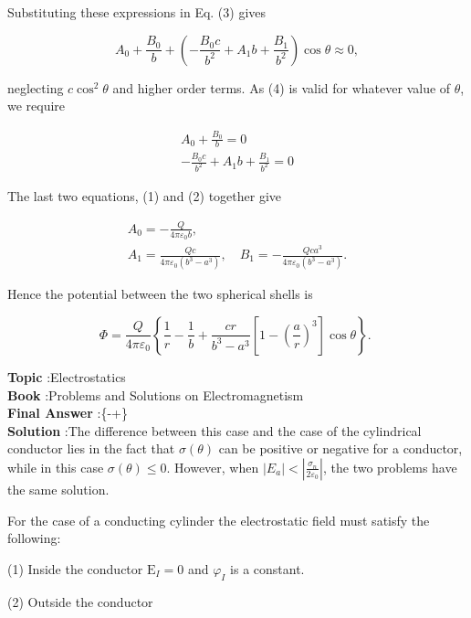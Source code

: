 \documentclass[10pt]{article}
\begin{document}
Substituting these expressions in Eq.
(3) gives

$$
A_{0}+\frac{B_{0}}{b}+\left(-\frac{B_{0} c}{b^{2}}+A_{1} b+\frac{B_{1}}{b^{2}}\right) \cos \theta \approx 0,
$$

neglecting $c \cos ^{2} \theta$ and higher order terms. As (4) is valid for whatever value of $\theta$, we require

$$
\begin{array}{r}
A_{0}+\frac{B_{0}}{b}=0 \\
-\frac{B_{0} c}{b^{2}}+A_{1} b+\frac{B_{1}}{b^{2}}=0
\end{array}
$$

The last two equations,
(1) and (2) together give

$$
\begin{gathered}
A_{0}=-\frac{Q}{4 \pi \varepsilon_{0} b}, \\
A_{1}=\frac{Q c}{4 \pi \varepsilon_{0}\left(b^{3}-a^{3}\right)}, \quad B_{1}=-\frac{Q c a^{3}}{4 \pi \varepsilon_{0}\left(b^{3}-a^{3}\right)} .
\end{gathered}
$$

Hence the potential between the two spherical shells is

$$
\Phi=\frac{Q}{4 \pi \varepsilon_{0}}\left\{\frac{1}{r}-\frac{1}{b}+\frac{c r}{b^{3}-a^{3}}\left[1-\left(\frac{a}{r}\right)^{3}\right] \cos \theta\right\} \text {. }
$$

\textbf{Topic} :Electrostatics\\
\textbf{Book} :Problems and Solutions on Electromagnetism\\
\textbf{Final Answer} :\left\{-+ \cos \theta\right\}\\


\textbf{Solution} :The difference between this case and the case of the cylindrical conductor lies in the fact that $\sigma(\theta)$ can be positive or negative for a conductor, while in this case $\sigma(\theta) \leq 0$. However, when $\left|E_{a}\right|<\left|\frac{\sigma_{n}}{2 \varepsilon_{0}}\right|$, the two problems have the same solution.

 For the case of a conducting cylinder the electrostatic field must satisfy the following:

(1) Inside the conductor $\mathrm{E}_{I}=0$ and $\varphi_{I}$ is a constant.

(2) Outside the conductor
\end{document}
